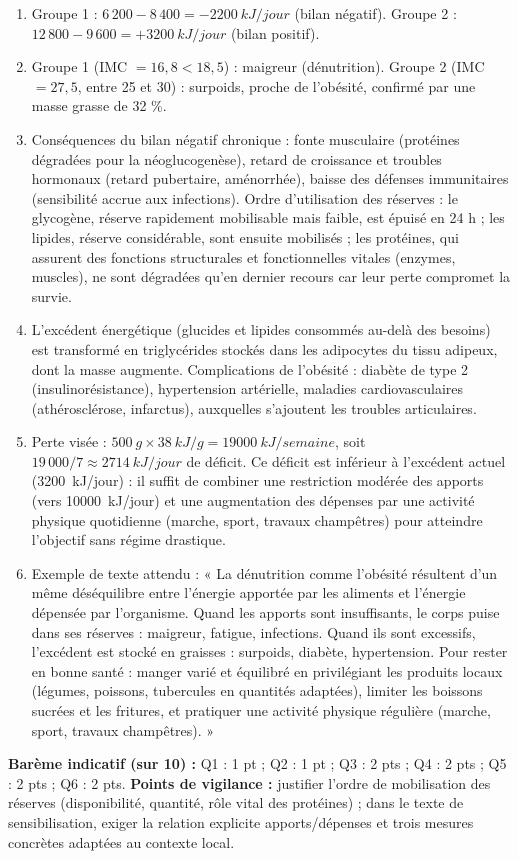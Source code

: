 \documentclass[11pt]{article}
\begin{document}
\begin{corrige}
\begin{enumerate}
\item Groupe 1 : $6\,200 - 8\,400 = -\SI{2200}{kJ/jour}$ (bilan négatif). Groupe 2 : $12\,800 - 9\,600 = +\SI{3200}{kJ/jour}$ (bilan positif).
\item Groupe 1 (IMC $= 16,8 < 18,5$) : maigreur (dénutrition). Groupe 2 (IMC $= 27,5$, entre 25 et 30) : surpoids, proche de l'obésité, confirmé par une masse grasse de 32 \%.
\item Conséquences du bilan négatif chronique : fonte musculaire (protéines dégradées pour la néoglucogenèse), retard de croissance et troubles hormonaux (retard pubertaire, aménorrhée), baisse des défenses immunitaires (sensibilité accrue aux infections). Ordre d'utilisation des réserves : le glycogène, réserve rapidement mobilisable mais faible, est épuisé en 24 h ; les lipides, réserve considérable, sont ensuite mobilisés ; les protéines, qui assurent des fonctions structurales et fonctionnelles vitales (enzymes, muscles), ne sont dégradées qu'en dernier recours car leur perte compromet la survie.
\item L'excédent énergétique (glucides et lipides consommés au-delà des besoins) est transformé en triglycérides stockés dans les adipocytes du tissu adipeux, dont la masse augmente. Complications de l'obésité : diabète de type 2 (insulinorésistance), hypertension artérielle, maladies cardiovasculaires (athérosclérose, infarctus), auxquelles s'ajoutent les troubles articulaires.
\item Perte visée : $\SI{500}{g} \times \SI{38}{kJ/g} = \SI{19000}{kJ/semaine}$, soit $19\,000 / 7 \approx \SI{2714}{kJ/jour}$ de déficit. Ce déficit est inférieur à l'excédent actuel (\SI{3200}{kJ/jour}) : il suffit de combiner une restriction modérée des apports (vers \SI{10000}{kJ/jour}) et une augmentation des dépenses par une activité physique quotidienne (marche, sport, travaux champêtres) pour atteindre l'objectif sans régime drastique.
\item Exemple de texte attendu : « La dénutrition comme l'obésité résultent d'un même déséquilibre entre l'énergie apportée par les aliments et l'énergie dépensée par l'organisme. Quand les apports sont insuffisants, le corps puise dans ses réserves : maigreur, fatigue, infections. Quand ils sont excessifs, l'excédent est stocké en graisses : surpoids, diabète, hypertension. Pour rester en bonne santé : manger varié et équilibré en privilégiant les produits locaux (légumes, poissons, tubercules en quantités adaptées), limiter les boissons sucrées et les fritures, et pratiquer une activité physique régulière (marche, sport, travaux champêtres). »
\end{enumerate}
\textbf{Barème indicatif (sur 10) :} Q1 : 1 pt ; Q2 : 1 pt ; Q3 : 2 pts ; Q4 : 2 pts ; Q5 : 2 pts ; Q6 : 2 pts.
\textbf{Points de vigilance :} justifier l'ordre de mobilisation des réserves (disponibilité, quantité, rôle vital des protéines) ; dans le texte de sensibilisation, exiger la relation explicite apports/dépenses et trois mesures concrètes adaptées au contexte local.
\end{corrige}
\end{document}
